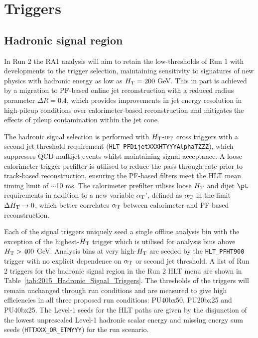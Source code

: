 \section{Triggers}
\label{sec:triggers}


\subsection{Hadronic signal region}

In Run 2 the RA1 analysis will aim to retain the low-thresholds of Run 1 with developments to the trigger selection, maintaining sensitivity to signatures of new physics with hadronic energy as low as $\mbox{$H_\text{T}$} = 200$ GeV. This in part is achieved by a migration to PF-based online jet reconstruction with a reduced radius parameter $\Delta R = 0.4$, which provides improvements in jet energy resolution in high-pileup conditions over calorimeter-based reconstruction and mitigates the effects of pileup contamination within the jet cone.

The hadronic signal selection is performed with $\mbox{$H_\text{T}$}$-$\alpha_{\text{T}}$ cross triggers with a second jet threshold requirement (\verb!HLT_PFDijetXXXHTYYYAlphaTZZZ!), which suppresses QCD multijet events whilst maintaining signal acceptance.  A loose calorimeter trigger prefilter is utilised to reduce the pass-through rate prior to track-based reconstruction, ensuring the PF-based filters meet the HLT mean timing limit of $\sim$10 ms. The calorimeter prefilter utlises loose $\mbox{$H_\text{T}$}$ and dijet $\pt$ requirements in addition to a new variable $\alpha_{\text{T}}$', defined as $\alpha_{\text{T}}$ in the limit $\Delta\mbox{$H_\text{T}$} \rightarrow 0$, which better correlates $\alpha_{\text{T}}$ between calorimeter and PF-based reconstruction.

Each of the signal triggers uniquely seed a single offline analysis bin with the exception of the highest-$\mbox{$H_\text{T}$}$ trigger which is utilised for analysis bins above $\mbox{$H_\text{T}$} > 400$ GeV. Analysis bins at very high-$\mbox{$H_\text{T}$}$ are seeded by the \verb!HLT_PFHT900! trigger with no explicit dependence on $\alpha_{\text{T}}$ or second jet threshold. A list of Run 2 triggers for the hadronic signal region in the Run 2 HLT menu are shown in Table~\ref{tab:2015_Hadronic_Signal_Triggers}. The thresholds of the triggers will remain unchanged through run conditions and are measured to give high efficiencies in all three proposed run conditions: PU40bx50, PU20bx25 and PU40bx25. The Level-1 seeds for the HLT paths are given by the disjunction of the lowest unprescaled Level-1 hadronic scalar energy and missing energy sum seeds (\verb!HTTXXX_OR_ETMYYY!) for the run scenario.

